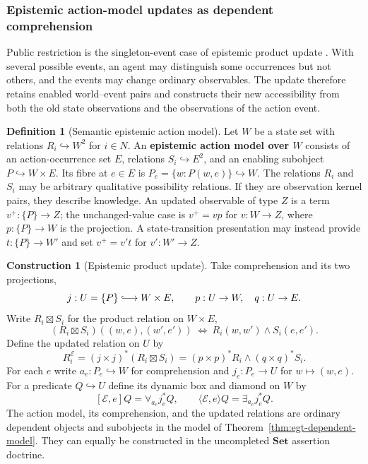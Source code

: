 \documentclass[11pt,a4paper]{article}
\numberwithin{equation}{section}
\theoremstyle{definition}
\newtheorem{definition}[theorem]{Definition}
\newtheorem{construction}[construction]{Construction}
\theoremstyle{remark}
\theoremstyle{plain}
\begin{document}
\subsubsection{Epistemic action-model updates as dependent comprehension}
\label{sec:egt-action-model-update}

Public restriction is the singleton-event case of epistemic
product update \citet{BaltagMossSolecki1998PublicAnnouncements}.
With several possible events, an agent may distinguish some occurrences
but not others, and the events may change ordinary observables.
The update therefore retains enabled world--event pairs and constructs
their new accessibility from both the old state observations and the
observations of the action event.

\begin{definition}[Semantic epistemic action model]
\label{def:egt-epistemic-action-model}
Let $W$ be a state set with relations $R_i\hookrightarrow W^2$ for
$i\in N$. An \textbf{epistemic action model over $W$} consists of
an action-occurrence set $E$, relations $S_i\hookrightarrow E^2$, and
an enabling subobject $P\hookrightarrow W\times E$. Its fibre at
$e\in E$ is $P_e=\{w:P(w,e)\}\hookrightarrow W$.
The relations $R_i$ and $S_i$ may be arbitrary qualitative possibility
relations. If they are observation kernel pairs, they describe knowledge.
An updated observable of type $Z$ is a term $v^+:\{P\}\to Z$; the
unchanged-value case is $v^+=v p$ for $v:W\to Z$, where
$p:\{P\}\to W$ is the projection. A state-transition presentation may
instead provide $t:\{P\}\to W'$ and set $v^+=v't$ for $v':W'\to Z$.
\end{definition}

\begin{construction}[Epistemic product update]
\label{con:egt-action-product}
Take comprehension and its two projections,
\[
 j:U=\{P\}\lhook\joinrel\longrightarrow W\times E,
 \qquad p:U\to W,\quad q:U\to E.
\]
Write $R_i\boxtimes S_i$ for the product relation on $W\times E$,
\[
 (R_i\boxtimes S_i)((w,e),(w',e'))
 \ \Longleftrightarrow\ R_i(w,w')\wedge S_i(e,e').
\]
Define the updated relation on $U$ by
\begin{equation}\label{eq:egt-action-updated-relation}
 R_i^{\mathcal E}=(j\times j)^*(R_i\boxtimes S_i)
       =(p\times p)^*R_i\wedge(q\times q)^*S_i.
\end{equation}
For each $e$ write $a_e:P_e\hookrightarrow W$ for comprehension and
$j_e:P_e\to U$ for $w\mapsto(w,e)$. For a predicate $Q\hookrightarrow U$
define its dynamic box and diamond on $W$ by
\begin{equation}\label{eq:egt-action-dynamic-modalities}
 [\mathcal E,e]Q=\forall_{a_e}j_e^*Q,\qquad
 \langle\mathcal E,e\rangle Q=\exists_{a_e}j_e^*Q.
\end{equation}
The action model, its comprehension, and the updated relations are
ordinary dependent objects and subobjects in the model of
Theorem~\ref{thm:egt-dependent-model}. They can equally be constructed
in the uncompleted $\mathbf{Set}$ assertion doctrine.
\end{construction}
\end{document}
